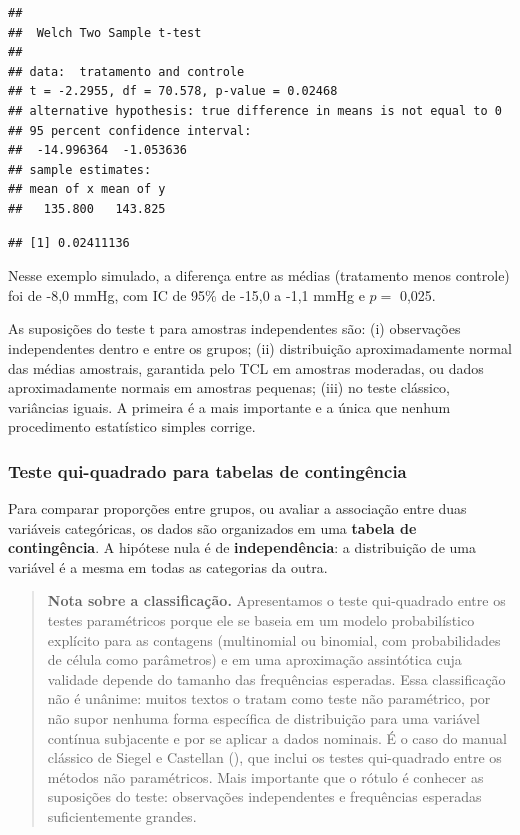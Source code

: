 \documentclass[
]{book}
\newenvironment{Shaded}{\begin{snugshade}}{\end{snugshade}}
\newcommand{\AttributeTok}[1]{\textcolor[rgb]{0.13,0.29,0.53}{#1}}
\newcommand{\CommentTok}[1]{\textcolor[rgb]{0.56,0.35,0.01}{\textit{#1}}}
\newcommand{\ConstantTok}[1]{\textcolor[rgb]{0.56,0.35,0.01}{#1}}
\newcommand{\FunctionTok}[1]{\textcolor[rgb]{0.13,0.29,0.53}{\textbf{#1}}}
\newcommand{\NormalTok}[1]{#1}
\newcommand{\SpecialCharTok}[1]{\textcolor[rgb]{0.81,0.36,0.00}{\textbf{#1}}}
\begin{document}
\begin{verbatim}
## 
##  Welch Two Sample t-test
## 
## data:  tratamento and controle
## t = -2.2955, df = 70.578, p-value = 0.02468
## alternative hypothesis: true difference in means is not equal to 0
## 95 percent confidence interval:
##  -14.996364  -1.053636
## sample estimates:
## mean of x mean of y 
##   135.800   143.825
\end{verbatim}

\begin{Shaded}
\end{Shaded}

\begin{verbatim}
## [1] 0.02411136
\end{verbatim}

Nesse exemplo simulado, a diferença entre as médias (tratamento menos controle) foi de -8,0 mmHg, com IC de 95\% de -15,0 a -1,1 mmHg e \(p =\) 0,025.

As suposições do teste t para amostras independentes são: (i) observações independentes dentro e entre os grupos; (ii) distribuição aproximadamente normal das médias amostrais, garantida pelo TCL em amostras moderadas, ou dados aproximadamente normais em amostras pequenas; (iii) no teste clássico, variâncias iguais. A primeira é a mais importante e a única que nenhum procedimento estatístico simples corrige.

\subsubsection{Teste qui-quadrado para tabelas de contingência}\label{teste-qui-quadrado-para-tabelas-de-continguxeancia}

Para comparar proporções entre grupos, ou avaliar a associação entre duas variáveis categóricas, os dados são organizados em uma \textbf{tabela de contingência}. A hipótese nula é de \textbf{independência}: a distribuição de uma variável é a mesma em todas as categorias da outra.

\begin{quote}
\textbf{Nota sobre a classificação.} Apresentamos o teste qui-quadrado entre os testes paramétricos porque ele se baseia em um modelo probabilístico explícito para as contagens (multinomial ou binomial, com probabilidades de célula como parâmetros) e em uma aproximação assintótica cuja validade depende do tamanho das frequências esperadas. Essa classificação não é unânime: muitos textos o tratam como teste não paramétrico, por não supor nenhuma forma específica de distribuição para uma variável contínua subjacente e por se aplicar a dados nominais. É o caso do manual clássico de Siegel e Castellan (), que inclui os testes qui-quadrado entre os métodos não paramétricos. Mais importante que o rótulo é conhecer as suposições do teste: observações independentes e frequências esperadas suficientemente grandes.
\end{quote}
\end{document}
